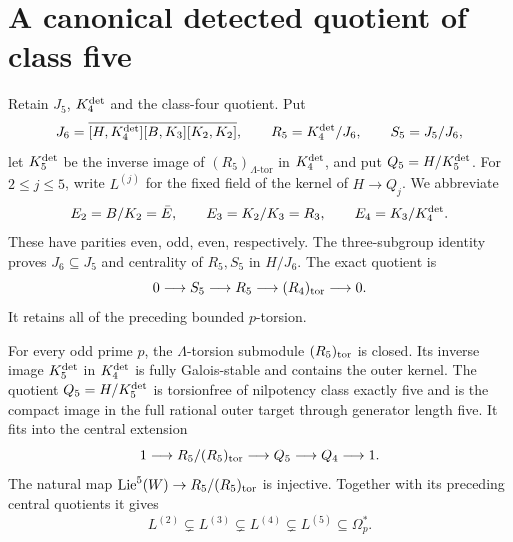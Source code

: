 \section{A canonical detected quotient of class five}
\label{sec:canonical-class-five}

Retain $J_5$, $K_4^{\rm det}$ and the class-four quotient.
Put
\[
 J_6=\overline{[H,K_4^{\rm det}][B,K_3][K_2,K_2]},
 \qquad R_5=K_4^{\rm det}/J_6,
 \qquad S_5=J_5/J_6,
\]
let \(K_5^{\rm det}\) be the inverse image of \((R_5)_{\Lambda\text{-tor}}\) in \(K_4^{\rm det}\), and put \(Q_5=H/K_5^{\rm det}\). For \(2\leq j\leq5\), write \(L^{(j)}\) for the fixed field of the kernel of \(H\to Q_j\). We abbreviate
\[
 E_2=B/K_2=\bar E,
 \qquad E_3=K_2/K_3=R_3,
 \qquad E_4=K_3/K_4^{\rm det}.
\]
These have parities even, odd, even, respectively.
The three-subgroup identity proves $J_6\subseteq J_5$
and centrality of $R_5,S_5$ in $H/J_6$. The exact
quotient is
\begin{equation}\label{eq:class5-old-torsion}
 0\longrightarrow S_5\longrightarrow R_5
                  \longrightarrow(R_4)_{\rm tor}\longrightarrow0.
\end{equation}
It retains all of the preceding bounded $p$-torsion.



\begin{theorem}\label{thm:canonical-class-five}
For every odd prime $p$, the $\Lambda$-torsion submodule
$(R_5)_{\rm tor}$ is closed. Its inverse image
$K_5^{\rm det}$ in $K_4^{\rm det}$ is fully
Galois-stable and contains the outer kernel.
The quotient $Q_5=H/K_5^{\rm det}$ is torsionfree of
nilpotency class exactly five and is the compact
image in the full rational outer target through
generator length five. It fits into the central
extension
\[
 1\longrightarrow R_5/(R_5)_{\rm tor}
 \longrightarrow Q_5\longrightarrow Q_4\longrightarrow1.
\]
The natural map
$\operatorname{Lie}^5(W)\to R_5/(R_5)_{\rm tor}$ is injective.
Together with its preceding central quotients it gives
\[
 L^{(2)}\subsetneq L^{(3)}\subsetneq L^{(4)}
                         \subsetneq L^{(5)}\subseteq\Omega_p^*.
\]
\end{theorem}

